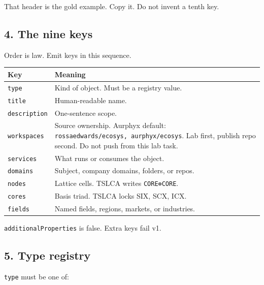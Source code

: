 That header is the gold example. Copy it. Do not invent a tenth key.

\subsection{4. The nine keys}\label{the-nine-keys}

Order is law. Emit keys in this sequence.

{\def\LTcaptype{none} %
\begin{longtable}[]{@{}
  >{\raggedright\arraybackslash}p{}
  >{\raggedright\arraybackslash}p{}@{}}
\toprule\noalign{}
\begin{minipage}[b]{\linewidth}\raggedright
Key
\end{minipage} & \begin{minipage}[b]{\linewidth}\raggedright
Meaning
\end{minipage} \\
\midrule\noalign{}
\endhead
\bottomrule\noalign{}
\endlastfoot
\texttt{type} & Kind of object. Must be a registry value. \\
\texttt{title} & Human-readable name. \\
\texttt{description} & One-sentence scope. \\
\texttt{workspaces} & Source ownership. Aurphyx default: \texttt{rossaedwards/ecosys,\ aurphyx/ecosys}. Lab first, publish repo second. Do not push from this lab task. \\
\texttt{services} & What runs or consumes the object. \\
\texttt{domains} & Subject, company domains, folders, or repos. \\
\texttt{nodes} & Lattice cells. TSLCA writes \texttt{CORE⊗CORE}. \\
\texttt{cores} & Basis triad. TSLCA locks SIX, SCX, ICX. \\
\texttt{fields} & Named fields, regions, markets, or industries. \\
\end{longtable}
}

\texttt{additionalProperties} is false. Extra keys fail v1.

\subsection{5. Type registry}\label{type-registry}

\texttt{type} must be one of:

